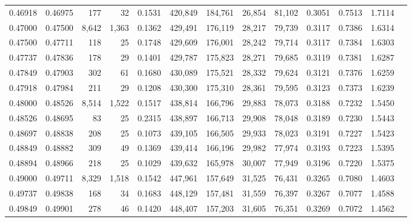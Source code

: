 \begin{tabular}{rrrrrrrrrrrrr}
0.46918 & 0.46975 &    177 &    32 &                                     0.1531 & 420,849 & 184,761 &  26,854 &  81,102 & 0.3051 & 0.7513 & 1.7114 \\
0.47000 & 0.47500 &  8,642 & 1,363 &                                     0.1362 & 429,491 & 176,119 &  28,217 &  79,739 & 0.3117 & 0.7386 & 1.6314 \\
0.47500 & 0.47711 &    118 &    25 &                                     0.1748 & 429,609 & 176,001 &  28,242 &  79,714 & 0.3117 & 0.7384 & 1.6303 \\
0.47737 & 0.47836 &    178 &    29 &                                     0.1401 & 429,787 & 175,823 &  28,271 &  79,685 & 0.3119 & 0.7381 & 1.6287 \\
0.47849 & 0.47903 &    302 &    61 &                                     0.1680 & 430,089 & 175,521 &  28,332 &  79,624 & 0.3121 & 0.7376 & 1.6259 \\
0.47918 & 0.47984 &    211 &    29 &                                     0.1208 & 430,300 & 175,310 &  28,361 &  79,595 & 0.3123 & 0.7373 & 1.6239 \\
0.48000 & 0.48526 &  8,514 & 1,522 &                                     0.1517 & 438,814 & 166,796 &  29,883 &  78,073 & 0.3188 & 0.7232 & 1.5450 \\
0.48526 & 0.48695 &     83 &    25 &                                     0.2315 & 438,897 & 166,713 &  29,908 &  78,048 & 0.3189 & 0.7230 & 1.5443 \\
0.48697 & 0.48838 &    208 &    25 &                                     0.1073 & 439,105 & 166,505 &  29,933 &  78,023 & 0.3191 & 0.7227 & 1.5423 \\
0.48849 & 0.48882 &    309 &    49 &                                     0.1369 & 439,414 & 166,196 &  29,982 &  77,974 & 0.3193 & 0.7223 & 1.5395 \\
0.48894 & 0.48966 &    218 &    25 &                                     0.1029 & 439,632 & 165,978 &  30,007 &  77,949 & 0.3196 & 0.7220 & 1.5375 \\
0.49000 & 0.49711 &  8,329 & 1,518 &                                     0.1542 & 447,961 & 157,649 &  31,525 &  76,431 & 0.3265 & 0.7080 & 1.4603 \\
0.49737 & 0.49838 &    168 &    34 &                                     0.1683 & 448,129 & 157,481 &  31,559 &  76,397 & 0.3267 & 0.7077 & 1.4588 \\
0.49849 & 0.49901 &    278 &    46 &                                     0.1420 & 448,407 & 157,203 &  31,605 &  76,351 & 0.3269 & 0.7072 & 1.4562 \\

\end{tabular}
